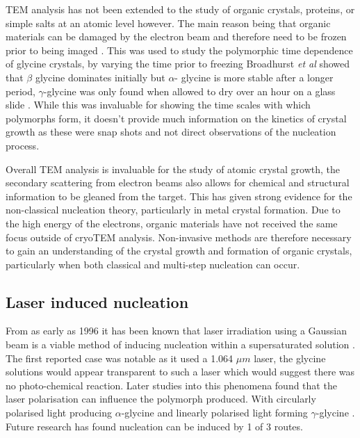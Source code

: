 TEM analysis has not been extended to the study of organic 
crystals, proteins, or simple salts at an atomic level 
however. The main reason being that organic materials can be 
damaged by the electron beam and therefore need to be frozen 
prior to being imaged \cite{Champness2020}. This was used to 
study the polymorphic time dependence of glycine crystals, by 
varying the time prior to freezing Broadhurst \textit{et al} 
showed that $\beta$ glycine dominates initially but $\alpha$-
glycine is more stable after a longer period, $\gamma$-glycine 
was only found when allowed to dry over an hour on a glass slide \cite{Broadhurst2020}. While this was invaluable for showing 
the time scales with which polymorphs form, it doesn't provide 
much information on the kinetics of crystal growth as these 
were snap shots and not direct observations of the nucleation 
process.

Overall TEM analysis is invaluable for the study of atomic 
crystal growth, the secondary scattering from electron 
beams also allows for chemical and structural information 
to be gleaned from the target. This has given strong evidence
for the non-classical nucleation theory, particularly in 
metal crystal formation. Due to the high energy of the 
electrons, organic materials have not received the same
focus outside of cryoTEM analysis. Non-invasive methods
are therefore necessary to gain an understanding of the
crystal growth and formation of organic crystals, 
particularly when both classical and multi-step nucleation 
can occur.

\subsection{Laser induced nucleation}
From as early as 1996 it has been known that laser irradiation 
using a Gaussian beam is a viable method of inducing nucleation 
within a supersaturated solution \cite{Garetz1996}. The first 
reported case was notable as it used a 1.064 $\mu m$ laser, the 
glycine solutions would appear transparent to such a laser which 
would suggest there was no photo-chemical reaction. Later studies 
into this phenomena found that the laser polarisation can influence 
the polymorph produced. With circularly polarised light producing 
$\alpha$-glycine and linearly polarised light forming $\gamma$-glycine 
\cite{Garetz2002}. Future research has found nucleation can be 
induced by 1 of 3 routes.

